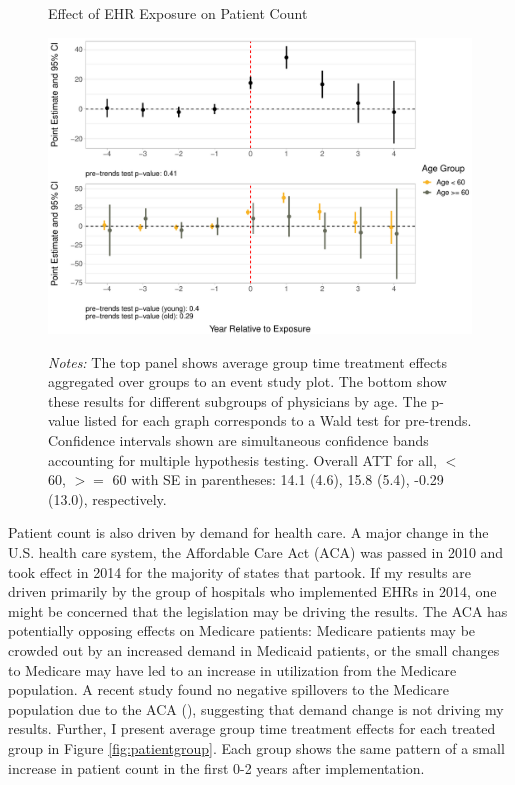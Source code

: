 \documentclass[12pt]{article}
\begin{document}
\begin{figure}[ht]
    \centering
    \captionsetup{width=.85\linewidth}
    \caption{Effect of EHR Exposure on Patient Count}
    \includegraphics[scale=.6]{Objects/patient_plot.pdf}
    \label{fig:patient}
    \vspace{2mm}
    \caption*{\footnotesize{\textit{Notes:} The top panel shows average group time treatment effects aggregated over groups to an event study plot. The bottom show these results for different subgroups of physicians by age. The p-value listed for each graph corresponds to a Wald test for pre-trends. Confidence intervals shown are simultaneous confidence bands accounting for multiple hypothesis testing. Overall ATT for all, $<$ 60, $>=$ 60 with SE in parentheses: 14.1 (4.6), 15.8 (5.4), -0.29 (13.0), respectively.}}
\end{figure}

Patient count is also driven by demand for health care. A major change in the U.S. health care system, the Affordable Care Act (ACA) was passed in 2010 and took effect in 2014 for the majority of states that partook. If my results are driven primarily by the group of hospitals who implemented EHRs in 2014, one might be concerned that the legislation may be driving the results. The ACA has potentially opposing effects on Medicare patients: Medicare patients may be crowded out by an increased demand in Medicaid patients, or the small changes to Medicare may have led to an increase in utilization from the Medicare population. A recent study found no negative spillovers to the Medicare population due to the ACA (\cite{carey2020impact}), suggesting that demand change is not driving my results. Further, I present average group time treatment effects for each treated group in Figure \ref{fig:patientgroup}. Each group shows the same pattern of a small increase in patient count in the first 0-2 years after implementation. 
\end{document}
